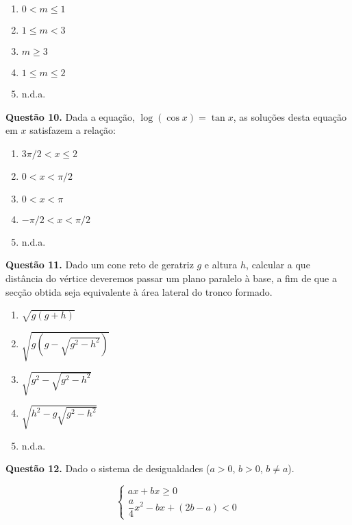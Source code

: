 \documentclass[11pt]{article}
\begin{document}
\begin{multicols}{3}
    \begin{enumerate}[\bf A (\quad)]
        \item $0 < m \leq 1$
        \item $1 \leq m < 3$
        \item $m \geq 3$
        \item $1 \leq m \leq 2$
        \item n.d.a.
    \end{enumerate}
\end{multicols}

\textbf{Questão 10.} Dada a equação, $\log (\cos x) = \tan x $, as soluções desta equação em $x$ satisfazem a relação:

\begin{multicols}{3}
    \begin{enumerate}[\bf A (\quad)]
        \item $3\pi / 2 < x \leq 2$
        \item $0 < x < \pi /2$
        \item $0 < x < \pi$
        \item $- \pi /2 < x < \pi /2$
        \item n.d.a.
    \end{enumerate}
\end{multicols}

\textbf{Questão 11.} Dado um cone reto de geratriz $g$ e altura $h$, calcular a que distância do vértice deveremos passar um plano paralelo à base, a fim de que a secção obtida seja equivalente à área lateral do tronco formado.

\begin{multicols}{2}
    \begin{enumerate}[\bf A (\quad)]
        \item $\sqrt{g(g+h)}$
        \item $\sqrt{g(g - \sqrt{g^2 - h^2})}$
        \item $\sqrt{g^2 - \sqrt{g^2 - h^2}}$
        \item $\sqrt{h^2 - g \sqrt{g^2 - h^2}}$
        \item n.d.a.
    \end{enumerate}
\end{multicols}

\textbf{Questão 12.} Dado o sistema de desigualdades ($a > 0$, $b > 0$, $b \neq a$).

$$
\begin{cases}
ax + bx \geq 0 \\
\dfrac{a}{4}x^2 - bx + (2b-a) < 0 
\end{cases}
$$
\end{document}
